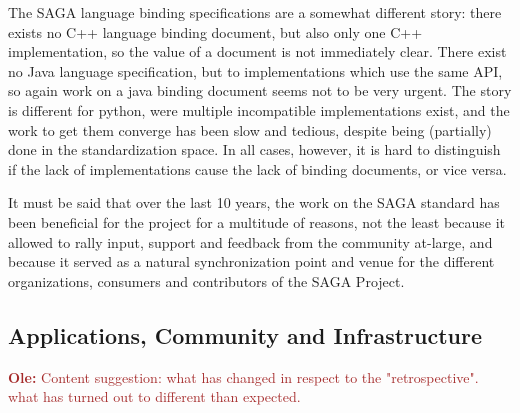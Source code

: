 \documentclass{article}
\newcommand{\B}[1]{\textbf{#1}}
\newcommand{\todo}[1]{{\textcolor{red}{\B{TODO:} #1 }}}
\newcommand{\jhanote}[1]{{\textcolor{red}{     \B{Shantenu:} #1 }}}
\newcommand{\ownote}[1]{{\textcolor{Brown}{   \B{Ole:     } #1 }}}
\newcommand{\jhanote}[1]{}
\newcommand{\ownote}[1]{}
\begin{document}
  The SAGA language binding specifications are a somewhat different
  story: there exists no C++ language binding document, but also only
  one C++ implementation, so the value of a document is not
  immediately clear.  There exist no Java language specification, but
  to implementations which use the same API, so again work on a java
  binding document seems not to be very urgent.  The story is
  different for python, were multiple incompatible implementations
  exist, and the work to get them converge has been slow and tedious,
  despite being (partially) done in the standardization space.  In all
  cases, however, it is hard to distinguish if the lack of
  implementations cause the lack of binding documents, or vice
  versa.
  
  It must be said that over the last 10 years, the work on the SAGA
  standard has been beneficial for the project for a multitude of
  reasons, not the least because it allowed to rally input, support
  and feedback from the community at-large, and because it served as a
  natural synchronization point and venue for the different
  organizations, consumers and contributors of the SAGA Project.


% 
 

\subsection{Applications, Community and Infrastructure}

\ownote{Content suggestion: what has changed in respect to the "retrospective". what 
has turned out to different than expected.}
\end{document}
